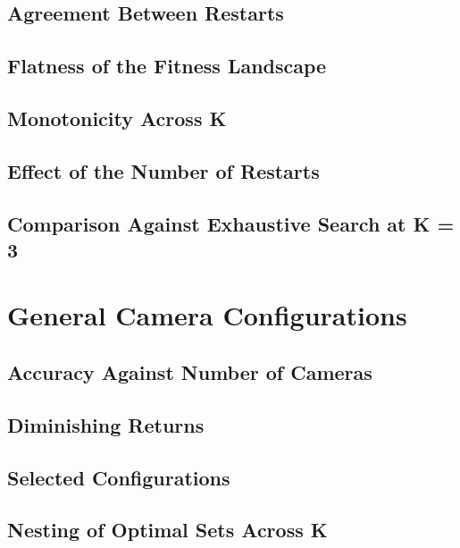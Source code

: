 \subsection{Agreement Between Restarts}

\subsection{Flatness of the Fitness Landscape}

\subsection{Monotonicity Across K}

\subsection{Effect of the Number of Restarts}

\subsection{Comparison Against Exhaustive Search at K = 3}

\section{General Camera Configurations}
\label{sec:generalconfigs}

\subsection{Accuracy Against Number of Cameras}

\subsection{Diminishing Returns}

\subsection{Selected Configurations}

\subsection{Nesting of Optimal Sets Across K}

